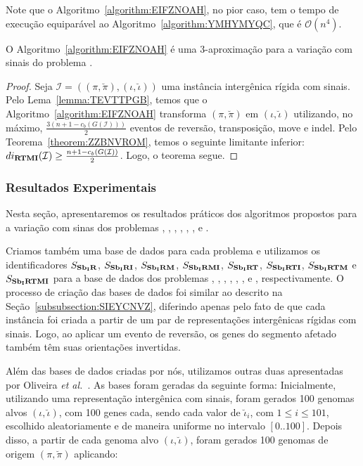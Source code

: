 Note que o Algoritmo~\ref{algorithm:EIFZNOAH}, no pior caso, tem o tempo de execução equiparável ao Algoritmo~\ref{algorithm:YMHYMYQC}, que é $\mathcal{O}(n^4)$.

\begin{theorem}\label{theorem:ZQMAXKGA}
O Algoritmo~\ref{algorithm:EIFZNOAH} é uma $3$-aproximação para a variação com sinais do problema \SbIRTMI{}.
\end{theorem}
\begin{proof}
Seja $\mathcal{I} = ((\pi,\breve\pi),(\iota,\breve\iota))$ uma instância intergênica rígida com sinais. Pelo Lema~\ref{lemma:TEVTTPGB}, temos que o Algoritmo~\ref{algorithm:EIFZNOAH} transforma $(\pi,\breve\pi)$ em $(\iota,\breve\iota)$ utilizando, no máximo, $\frac{3(n+1 - c_b(G(\mathcal{I})))}{2}$ eventos de reversão, transposição, move e indel. Pelo Teorema~\ref{theorem:ZZBNVROM}, temos o seguinte limitante inferior: $di_{\textbf{RTMI}}(\mathcal{I}) \ge\frac{{n + 1} - c_b(G(\mathcal{I}))}{2}$. Logo, o teorema segue.
\end{proof}

\subsubsection{Resultados Experimentais}

Nesta seção, apresentaremos os resultados práticos dos algoritmos propostos para a variação com sinas dos problemas \SbIR{}, \SbIRI{}, \SbIRM{}, \SbIRMI{}, \SbIRT{}, \SbIRTI{}, \SbIRTM{} e \SbIRTMI{}.

Criamos também uma base de dados para cada problema e utilizamos os identificadores $S_{\textbf{Sb\textsubscript{I}R}}{}$, $S_{\textbf{Sb\textsubscript{I}RI}}{}$, $S_{\textbf{Sb\textsubscript{I}RM}}{}$, $S_{\textbf{Sb\textsubscript{I}RMI}}{}$, $S_{\textbf{Sb\textsubscript{I}RT}}{}$, $S_{\textbf{Sb\textsubscript{I}RTI}}{}$, $S_{\textbf{Sb\textsubscript{I}RTM}}{}$ e $S_{\textbf{Sb\textsubscript{I}RTMI}}{}$ para a base de dados dos problemas \SbIR{}, \SbIRI{}, \SbIRM{}, \SbIRMI{}, \SbIRT{}, \SbIRTI{}, \SbIRTM{} e \SbIRTMI{}, respectivamente. O processo de criação das bases de dados foi similar ao descrito na Seção~\ref{subsubsection:SIEYCNVZ}, diferindo apenas pelo fato de que cada instância foi criada a partir de um par de representações intergênicas rígidas com sinais. Logo, ao aplicar um evento de reversão, os genes do segmento afetado também têm suas orientações invertidas.

Além das bases de dados criadas por nós, utilizamos outras duas apresentadas por Oliveira \textit{et al.}~\cite{2021a-oliveira-etal}. As bases foram geradas da seguinte forma: Inicialmente, utilizando uma representação  intergênica com sinais, foram gerados 100 genomas alvos $(\iota,\breve\iota)$, com 100 genes cada, sendo cada valor de $\breve\iota_i$, com $1 \le i \le 101$, escolhido aleatoriamente e de maneira uniforme no intervalo $[0..100]$. Depois disso, a partir de cada genoma alvo $(\iota,\breve\iota)$, foram gerados 100 genomas de origem $(\pi,\breve\pi)$ aplicando:

